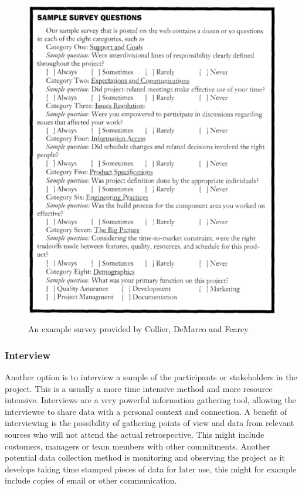 \documentclass[12pt]{article}
\begin{document}
\begin{figure}[h!]
	\centering
	\includegraphics[width=\textwidth]{figures/survey.png}
	\caption{An example survey provided by Collier, DeMarco and Fearey~\cite{Collier1996}}
	\label{figure:survey}
\end{figure}

\subsubsection{Interview} Another option is to interview a sample of the participants or stakeholders in the project. This is a usually a more time intensive method and more resource intensive. Interviews are a very powerful information gathering tool, allowing the interviewee to share data with a personal context and connection. A benefit of interviewing is the possibility of gathering points of view and data from relevant sources who will not attend the actual retrospective. This might include customers, managers or team members with other commitments. Another potential data collection method is monitoring and observing the project as it develops taking time stamped pieces of data for later use, this might for example include copies of email or other communication. 
\end{document}
